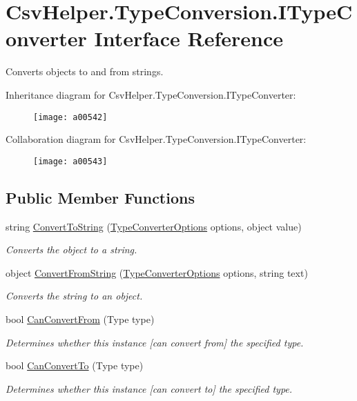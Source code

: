 \hypertarget{a00117}{\section{Csv\-Helper.\-Type\-Conversion.\-I\-Type\-Converter Interface Reference}
\label{a00117}
}


Converts objects to and from strings.  




Inheritance diagram for Csv\-Helper.\-Type\-Conversion.\-I\-Type\-Converter\-:
\nopagebreak
\begin{figure}[H]
\begin{center}
\leavevmode
\texttt{[image: a00542]}
\end{center}
\end{figure}


Collaboration diagram for Csv\-Helper.\-Type\-Conversion.\-I\-Type\-Converter\-:
\nopagebreak
\begin{figure}[H]
\begin{center}
\leavevmode
\texttt{[image: a00543]}
\end{center}
\end{figure}
\subsection*{Public Member Functions}
\begin{DoxyCompactItemize}
\item 
string \hyperlink{a00117_a90c465c63dbcf913f38aa878f35e77c7}{Convert\-To\-String} (\hyperlink{a00172}{Type\-Converter\-Options} options, object value)
\begin{DoxyCompactList}\small\item\em Converts the object to a string. \end{DoxyCompactList}\item 
object \hyperlink{a00117_ab598e04c22e5a7890b6d21011492283e}{Convert\-From\-String} (\hyperlink{a00172}{Type\-Converter\-Options} options, string text)
\begin{DoxyCompactList}\small\item\em Converts the string to an object. \end{DoxyCompactList}\item 
bool \hyperlink{a00117_ae1ad863656f4fa96bd846a41344c9349}{Can\-Convert\-From} (Type type)
\begin{DoxyCompactList}\small\item\em Determines whether this instance \mbox{[}can convert from\mbox{]} the specified type. \end{DoxyCompactList}\item 
bool \hyperlink{a00117_a168b03dad37fcb6882101c93deac8111}{Can\-Convert\-To} (Type type)
\begin{DoxyCompactList}\small\item\em Determines whether this instance \mbox{[}can convert to\mbox{]} the specified type. \end{DoxyCompactList}\end{DoxyCompactItemize}


